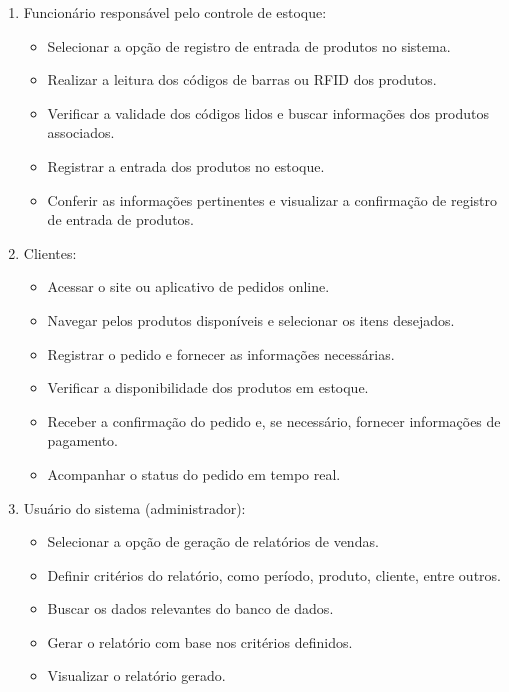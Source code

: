 \documentclass[
	12pt,				%
	openright,			%
	twoside,			%
	a4paper,			%
	english,			%
	brazil				%
	]{abntex2}
\begin{document}
\begin{enumerate}

	\item Funcionário responsável pelo controle de estoque:

	\begin{itemize}
		\item Selecionar a opção de registro de entrada de produtos no sistema.
		\item Realizar a leitura dos códigos de barras ou RFID dos produtos.
		\item Verificar a validade dos códigos lidos e buscar informações dos produtos associados.
		\item Registrar a entrada dos produtos no estoque.
		\item Conferir as informações pertinentes e visualizar a confirmação de registro de entrada de produtos.
	\end{itemize}

	\item 	Clientes:

	\begin{itemize}
		\item Acessar o site ou aplicativo de pedidos online.
		\item Navegar pelos produtos disponíveis e selecionar os itens desejados.
		\item Registrar o pedido e fornecer as informações necessárias.
		\item Verificar a disponibilidade dos produtos em estoque.
		\item Receber a confirmação do pedido e, se necessário, fornecer informações de pagamento.
		\item Acompanhar o status do pedido em tempo real.
	\end{itemize}

	\item 	Usuário do sistema (administrador):

	\begin{itemize}
		\item Selecionar a opção de geração de relatórios de vendas.
		\item Definir critérios do relatório, como período, produto, cliente, entre outros.
		\item Buscar os dados relevantes do banco de dados.
		\item Gerar o relatório com base nos critérios definidos.
		\item Visualizar o relatório gerado.
	\end{itemize}

\end{enumerate}
\end{document}
